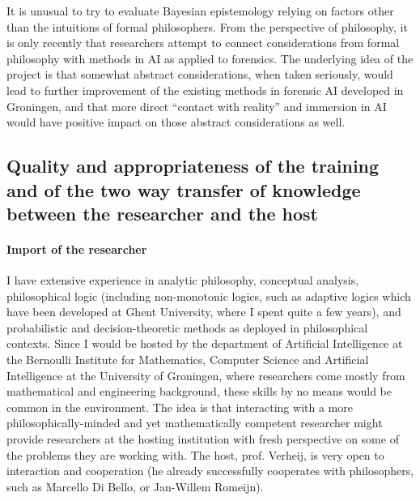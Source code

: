 \documentclass[11pt, a4paper]{article}
\begin{document}
 It is unusual to try to evaluate Bayesian epistemology relying on factors other than the intuitions of formal philosophers. From the perspective of philosophy, it is only recently that researchers attempt  to connect considerations from formal philosophy with methods in AI as applied to forensics.  The underlying idea of the project is that somewhat abstract considerations, when taken seriously, would lead to further improvement of  the existing methods in forensic AI developed in Groningen, and that more direct ``contact with reality'' and immersion in AI would have positive impact on those abstract considerations as well. 



\vspace{-4mm}

\subsection{Quality and appropriateness of the training and of the two way transfer of
knowledge between the researcher and the host}


\vspace{-3mm}

\paragraph{Import of the researcher}




I have extensive experience in analytic philosophy, conceptual analysis, philosophical logic (including non-monotonic logics, such as adaptive logics which have been developed at  Ghent University, where I spent quite a few years),  and probabilistic and decision-theoretic methods as deployed in philosophical contexts. Since I  would be hosted by the department of Artificial Intelligence at the Bernoulli Institute for Mathematics, Computer Science and Artificial Intelligence at the University of Groningen, where researchers come mostly from mathematical and engineering background, these skills  by no means would be common in the environment. The idea is that interacting with a more philosophically-minded and yet mathematically competent researcher might provide researchers at the hosting institution with fresh perspective on some of the problems they are working with. The host, prof. Verheij, is very open to interaction and cooperation (he already successfully cooperates with philosophers, such as Marcello Di Bello, or Jan-Willem Romeijn).
\end{document}

